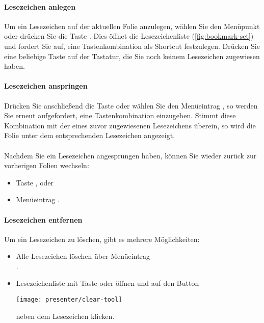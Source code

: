 \paragraph{Lesezeichen anlegen}
Um ein Lesezeichen auf der aktuellen Folie anzulegen, wählen Sie den Menüpunkt  oder drücken Sie die Taste . Dies öffnet die Lesezeichenliste (\autoref{fig:bookmark-set}) und fordert Sie auf, eine Tastenkombination als Shortcut festzulegen. Drücken Sie eine beliebige Taste auf der Tastatur, die Sie noch keinem Lesezeichen zugewiesen haben.

\paragraph{Lesezeichen anspringen}
Drücken Sie anschließend die Taste  oder wählen Sie den Menüeintrag , so werden Sie erneut aufgefordert, eine Tastenkombination einzugeben. Stimmt diese Kombination mit der eines zuvor zugewiesenen Lesezeichens überein, so wird die Folie unter dem entsprechenden Lesezeichen angezeigt.
\\\\
Nachdem Sie ein Lesezeichen angesprungen haben, können Sie wieder zurück zur vorherigen Folien wechseln:
\begin{itemize}
	\item Taste , oder
	\item Menüeintrag .
\end{itemize}

\paragraph{Lesezeichen entfernen}
Um ein Lesezeichen zu löschen, gibt es mehrere Möglichkeiten:

\begin{itemize}
	\item Alle Lesezeichen löschen über Menüeintrag \\.
	\item Lesezeichenliste mit Taste  oder  öffnen und auf den Button \begin{minipage}{0.025\textheight}
		\texttt{[image: presenter/clear-tool]}
	\end{minipage} neben dem Lesezeichen klicken.
\end{itemize}

